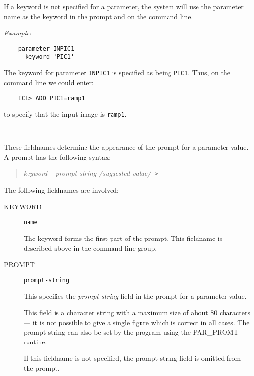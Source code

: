 \begin{description}
\begin{description}
If a keyword is not specified for a parameter, the system will use the
parameter name as the keyword in the prompt and on the command line.

{\em Example:}

\begin{small}
\begin{verbatim}
    parameter INPIC1
      keyword 'PIC1'
\end{verbatim}
\end{small}

The keyword for parameter \verb+INPIC1+ is specified as being \verb+PIC1+.
Thus, on the command line we could enter:

\begin{small}
\begin{verbatim}
    ICL> ADD PIC1=ramp1
\end{verbatim}
\end{small}

to specify that the input image is \verb+ramp1+.

\end{description}

\item [Prompt group] ---

These fieldnames determine the appearance of the prompt for a parameter value.
A prompt has the following syntax:
\begin{quote}
{\em keyword -- prompt-string /suggested-value/}~\verb+>+
\end{quote}
The following fieldnames are involved:

\begin{description}

\item [KEYWORD] {\tt name}

The keyword forms the first part of the prompt.
This fieldname is described above in the command line group.

\item [PROMPT] {\tt prompt-string}

This specifies the {\em prompt-string} field in the prompt for a parameter
value.

This field is a character string with a maximum size of about 80 characters ---
it is not possible to give a single figure which is correct in all cases.
The prompt-string can also be set by the program using the PAR\_PROMT routine.

If this fieldname is not specified, the prompt-string field is omitted from the
prompt.


\end{description}
\end{description}

